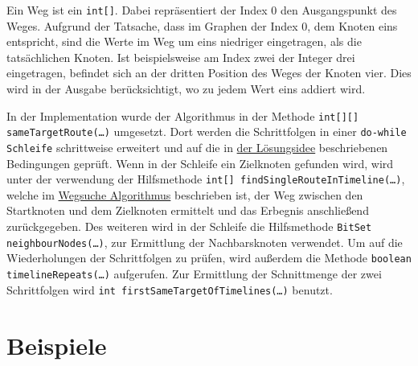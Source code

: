 \documentclass[a4paper,10pt,ngerman]{scrartcl}
\begin{document}
    Ein Weg ist ein \texttt{int[]}.
    Dabei repräsentiert der Index 0 den Ausgangspunkt des Weges.
    Aufgrund der Tatsache,
    dass im Graphen der Index 0, dem Knoten eins entspricht,
    sind die Werte im Weg um eins niedriger eingetragen, als die tatsächlichen Knoten.
    Ist beispielsweise am Index zwei der Integer drei eingetragen,
    befindet sich an der dritten Position des Weges der Knoten vier.
    Dies wird in der Ausgabe berücksichtigt, wo zu jedem Wert eins addiert wird.

    In der Implementation wurde der Algorithmus in der Methode
    \texttt{int[][] sameTargetRoute(\ldots)} umgesetzt.
    Dort werden die Schrittfolgen in einer \texttt{do-while Schleife} schrittweise erweitert
    und auf die in \hyperref[sec:losungsidee]{der Lösungsidee} beschriebenen Bedingungen geprüft.
    Wenn in der Schleife ein Zielknoten gefunden wird, wird unter der verwendung der Hilfsmethode
    \texttt{int[] findSingleRouteInTimeline(\ldots)},
    welche im \hyperref[alg:Algorithm1]{Wegsuche Algorithmus} beschrieben ist,
    der Weg zwischen den Startknoten und dem Zielknoten ermittelt und das Erbegnis anschließend zurückgegeben.
    Des weiteren wird in der Schleife die Hilfsmethode
    \texttt{BitSet neighbourNodes(\ldots)},
    zur Ermittlung der Nachbarsknoten verwendet.
    Um auf die Wiederholungen der Schrittfolgen zu prüfen, wird außerdem die Methode
    \texttt{boolean timelineRepeats(\ldots)} aufgerufen.
    Zur Ermittlung der Schnittmenge der zwei Schrittfolgen wird
    \texttt{int firstSameTargetOfTimelines(\ldots)} benutzt.


    \section{Beispiele}\label{sec:beispiele}
        
\end{document}
